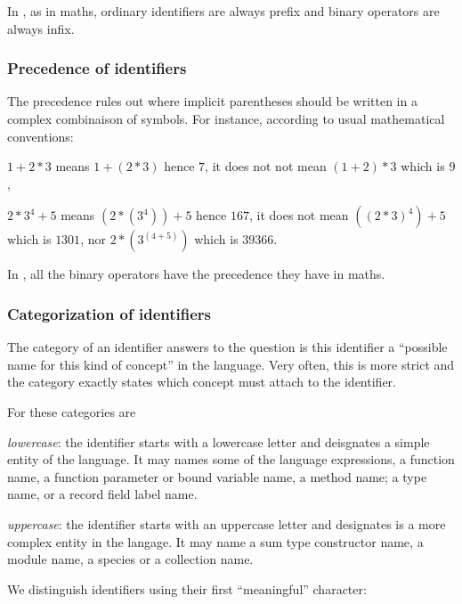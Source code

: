 In {\focal}, as in maths, ordinary identifiers are always prefix and binary operators are
always infix.

\subsubsection{Precedence of identifiers}

The precedence rules out where implicit parentheses should be written in a
complex combinaison of symbols. For instance, according to usual mathematical
conventions:
\begin{citemize}
\item $1 + 2 * 3$  means $1 + (2 * 3)$ hence $7$, it does not not mean $(1 +
  2) * 3$ which is $9$,
\item $2 * 3 ^ 4 + 5$ means $(2 * (3 ^ 4)) + 5$ hence $167$, it does not mean
  $((2 * 3) ^ 4) + 5$ which is $1301$, nor $2 * (3 ^ (4 + 5))$ which is $39366$.
\end{citemize}

In {\focal}, all the binary operators have the precedence they have in maths.

\subsubsection{Categorization of identifiers}

The category of an identifier answers to the question is this identifier a
``possible name for this kind of concept'' in the language.
Very often, this is more strict and the category exactly states which concept
must attach to the identifier.

For {\focal} these categories are
\begin{citemize}
\item {\em lowercase}: the identifier starts with a lowercase letter and
  deisgnates a simple entity of the language. It may names some of
  the language expressions, a function name, a function parameter or bound
  variable name, a method name; a type name, or a record field label name.

\item {\em uppercase}: the identifier starts with an uppercase letter and
  designates is a more complex entity in the langage. It may name a sum type
  constructor name, a module name, a species or a collection name.
\end{citemize}

We distinguish identifiers using their first ``meaningful'' character:

